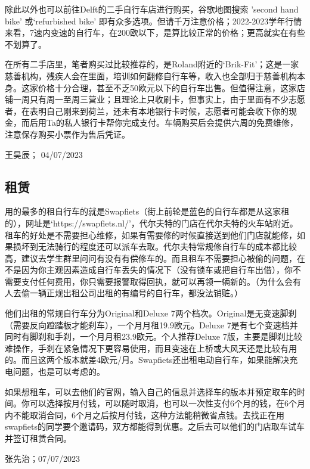 除此以外也可以前往Delft的二手自行车店进行购买，谷歌地图搜索 'second hand bike' 或‘refurbished bike’ 即有众多选项。但请千万注意价格；2022-2023学年行情来看，7速内变速的自行车，在200欧以下，是算比较正常的价格；更高就实在有些不划算了。

在所有二手店里，笔者购买过比较推荐的，是Roland附近的‘Brik-Fit’；这是一家慈善机构，残疾人会在里面，培训如何翻修自行车等，收入也全部归于慈善机构本身。这家价格十分合理，甚至不乏50欧元以下的自行车出售。但值得注意，这家店铺一周只有周一至周三营业；且理论上只收刷卡，但事实上，由于里面有不少志愿者，在表明自己刚来到荷兰，还未有本地银行卡时候，志愿者可能会收下你的现金，而后用Ta的私人银行卡帮你完成支付。车辆购买后会提供六周的免费维修，注意保存购买小票作为售后凭证。
\begin{flushright}
王昊辰； 04/07/2023
\end{flushright}

\subsection{租赁}
用的最多的租自行车的就是Swapfiets（街上前轮是蓝色的自行车都是从这家租的），网址是‘https://swapfiets.nl/’，代尔夫特的门店在代尔夫特的火车站附近。租车的好处是不需要担心维修，如果有需要修的时候直接送到他们门店就能修，如果损坏到无法骑行的程度还可以派车去取。代尔夫特常规修自行车的成本都比较高，建议去学生群里问问有没有有偿修车的。而且租车不需要担心被偷的问题，在不是因为你主观因素造成自行车丢失的情况下（没有锁车或把自行车出借），你不需要支付任何费用，你只需要报警取得回执，就可以再领一辆新的。（为什么会有人去偷一辆正规出租公司出租的有编号的自行车，都没法销赃。）

他们出租的常规自行车分为Original和Deluxe 7两个档次。Original是无变速脚刹（需要反向蹬踏板才能刹车），一个月月租19.9欧元。Deluxe 7是有七个变速档并同时有脚刹和手刹，一个月月租23.9欧元。个人推荐Deluxe 7版，主要是脚刹比较难操作，手刹在紧急情况下更容易使用，而且变速在上桥或大风天还是比较有用的。而且这两个版本就差4欧元/月。Swapfiets还出租电动自行车，如果能解决充电问题，也是可以考虑的。

如果想租车，可以去他们的官网，输入自己的信息并选择车的版本并预定取车的时间。你可以选择按月付钱，可以随时取消，也可以一次性支付6个月的钱，在6个月内不能取消合同，6个月之后按月付钱，这种方法能稍微省点钱。去找正在用swapfiets的同学要个邀请码，双方都能得到优惠。之后去可以他们的门店取车试车并签订租赁合同。
\begin{flushright}
张先治；07/07/2023
\end{flushright}

\vspace{\betsubsec} %
